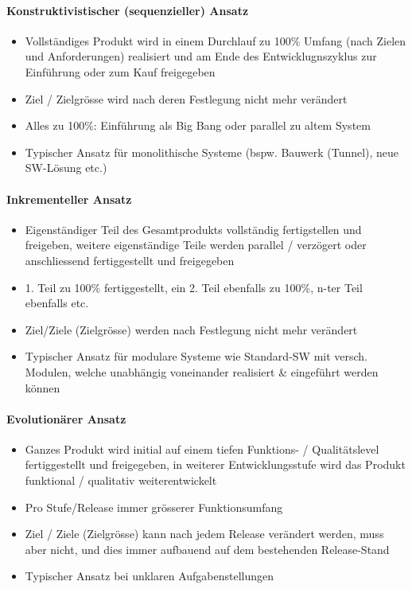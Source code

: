 \documentclass[a4paper]{article}
\begin{document}
			\paragraph{Konstruktivistischer (sequenzieller) Ansatz}
			
				\begin{itemize}
					\item Vollständiges Produkt wird in einem Durchlauf zu 100\% Umfang (nach Zielen und Anforderungen) realisiert und am Ende des Entwicklugnszyklus zur Einführung oder zum Kauf freigegeben
					\item Ziel / Zielgrösse wird nach deren Festlegung nicht mehr verändert
					\item Alles zu 100\%: Einführung als Big Bang oder parallel zu altem System
					\item Typischer Ansatz für monolithische Systeme (bspw. Bauwerk (Tunnel), neue SW-Lösung etc.)
				\end{itemize}
		
			\paragraph{Inkrementeller Ansatz}
			
				\begin{itemize}
					\item Eigenständiger Teil des Gesamtprodukts vollständig fertigstellen und freigeben, weitere eigenständige Teile werden parallel / verzögert oder anschliessend fertiggestellt und freigegeben
					\item 1. Teil zu 100\% fertiggestellt, ein 2. Teil ebenfalls zu 100\%, n-ter Teil ebenfalls etc.
					\item Ziel/Ziele (Zielgrösse) werden nach Festlegung nicht mehr verändert
					\item Typischer Ansatz für modulare Systeme wie Standard-SW mit versch. Modulen, welche unabhängig voneinander realisiert \& eingeführt werden können
				\end{itemize}
			
			\paragraph{Evolutionärer Ansatz}
			
				\begin{itemize}
					\item Ganzes Produkt wird initial auf einem tiefen Funktions- / Qualitätslevel fertiggestellt und freigegeben, in weiterer Entwicklungsstufe wird das Produkt funktional / qualitativ weiterentwickelt
					\item Pro Stufe/Release immer grösserer Funktionsumfang
					\item Ziel / Ziele (Zielgrösse) kann nach jedem Release verändert werden, muss aber nicht, und dies immer aufbauend auf dem bestehenden Release-Stand
					\item Typischer Ansatz bei unklaren Aufgabenstellungen
				\end{itemize}
			
\end{document}
